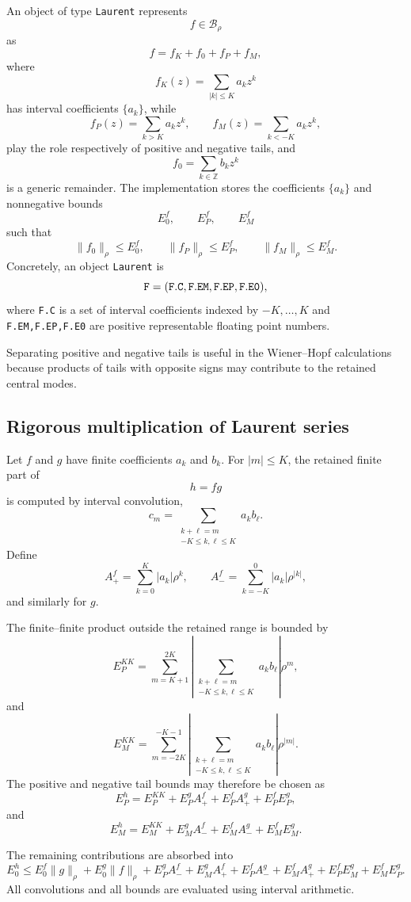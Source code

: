 \documentclass[11pt,a4paper]{amsart}
\begin{document}
An object of type {\tt Laurent} represents
\[
f\in\mathcal B_\rho
\]
as
\[f=f_K+f_0+f_P+f_M,\]
where
\[
f_K(z)
=
\sum_{|k|\le K}a_kz^k
\]
has interval coefficients $\{a_k\}$, while
\[
f_P(z)=\sum_{k>K}a_kz^k,
\qquad
f_M(z)=\sum_{k<-K}a_kz^k,
\]
play the role respectively of positive and negative tails, and
$$f_0=\sum_{k\in\mathbb Z}b_kz^k$$
is a generic remainder.
The implementation stores the coefficients $\{a_k\}$ and nonnegative bounds
\[
E_0^f,
\qquad
E_P^f,
\qquad
E_M^f
\]
such that
\[
\|f_0\|_\rho
\le
E_0^f,
\qquad
\|f_P\|_\rho
\le
E_P^f,
\qquad
\|f_M\|_\rho
\le
E_M^f.
\]
Concretely, an object {\tt Laurent} is
\[
{\tt F=(F.C,F.EM,F.EP,F.E0)},
\]
where {\tt F.C} is a set of interval coefficients indexed by
$-K,\ldots,K$ and {\tt F.EM,F.EP,F.E0} are positive representable floating point numbers.

Separating positive and negative tails is useful in the
Wiener--Hopf calculations because products of tails with opposite
signs may contribute to the retained central modes.

\subsection{Rigorous multiplication of Laurent series}
\label{sec:multiplication-laurent}

Let $f$ and $g$ have finite coefficients $a_k$ and $b_k$. For
$|m|\le K$, the retained finite part of
\[
h=fg
\]
is computed by interval convolution,
\[
c_m
=
\sum_{\substack{k+\ell=m\\-K\le k,\ell\le K}}
a_kb_\ell.
\]
Define
\[
A_+^f
=
\sum_{k=0}^K|a_k|\rho^k,
\qquad
A_-^f
=
\sum_{k=-K}^{0}|a_k|\rho^{|k|},
\]
and similarly for $g$.

The finite--finite product outside the retained range is bounded by
\[
E_P^{KK}
=
\sum_{m=K+1}^{2K}
\left|
\sum_{\substack{k+\ell=m\\-K\le k,\ell\le K}}
a_kb_\ell
\right|
\rho^m,
\]
and
\[
E_M^{KK}
=
\sum_{m=-2K}^{-K-1}
\left|
\sum_{\substack{k+\ell=m\\-K\le k,\ell\le K}}
a_kb_\ell
\right|
\rho^{|m|}.
\]
The positive and negative tail bounds may therefore be chosen as
\[
E_P^h
=
E_P^{KK}
+
E_P^gA_+^f
+
E_P^fA_+^g
+
E_P^fE_P^g,
\]
and
\[
E_M^h
=
E_M^{KK}
+
E_M^gA_-^f
+
E_M^fA_-^g
+
E_M^fE_M^g.
\]

The remaining contributions are absorbed into
\[
	E_0^h
	\le
	E_0^f\|g\|_\rho+E_0^g\|f\|_\rho+E_P^gA_-^f+E_M^gA_+^f+E_P^fA_-^g+E_M^fA_+^g
	+E_P^fE_M^g+E_M^fE_P^g.
\]
All convolutions and all bounds are evaluated using interval
arithmetic.
\end{document}
